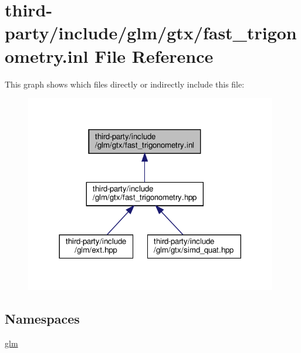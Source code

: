 \hypertarget{fast__trigonometry_8inl}{}\section{third-\/party/include/glm/gtx/fast\+\_\+trigonometry.inl File Reference}
\label{fast__trigonometry_8inl}
This graph shows which files directly or indirectly include this file\+:
\nopagebreak
\begin{figure}[H]
\begin{center}
\leavevmode
\includegraphics[width=312pt]{fast__trigonometry_8inl__dep__incl}
\end{center}
\end{figure}
\subsection*{Namespaces}
\begin{DoxyCompactItemize}
\item 
 \hyperlink{namespaceglm}{glm}
\end{DoxyCompactItemize}
